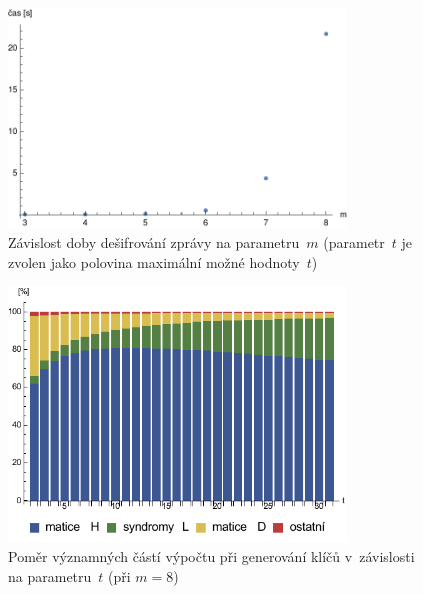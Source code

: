 \documentclass[thesis=M,czech,hidelinks]{FITthesis}[2012/06/26]
\newcommand{\0}{{\textcolor[gray]{0.75}{0}}}
\begin{document}
\begin{figure}[!ht]
    \centering
    \includegraphics[width=0.8\textwidth]{../implementace/grafy/listplot_tPul_desifrovani.pdf}
    \caption{
        Závislost doby dešifrování zprávy na parametru~$m$ (parametr~$t$ je
        zvolen jako polovina maximální možné hodnoty~$t$)
    }
    \label{obr_mereni_m_desifr}
\end{figure}

\begin{figure}[!ht]
    \centering
    \includegraphics[width=0.8\textwidth]{../implementace/grafy/chart_m8_generovani.pdf}
    \caption{
        Poměr významných částí výpočtu při generování klíčů v~závislosti na
        parametru~$t$ (při $m=8$)
    }
    \label{obr_mereni_pomer_gen}
\end{figure}
\end{document}
